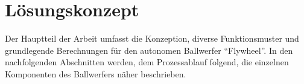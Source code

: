 \section{Lösungskonzept}
Der Hauptteil der Arbeit umfasst die Konzeption, diverse Funktionsmuster und 
grundlegende Berechnungen für den autonomen Ballwerfer \enquote{Flywheel}. 
In den nachfolgenden Abschnitten werden, dem Prozessablauf folgend, die einzelnen 
Komponenten des Ballwerfers näher beschrieben. 